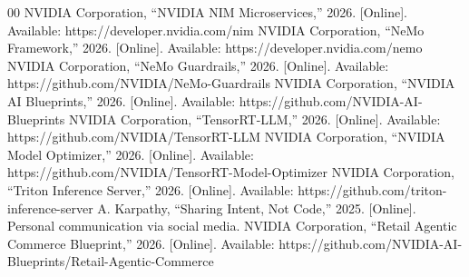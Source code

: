 \documentclass[conference]{IEEEtran}
\begin{document}
\begin{thebibliography}{00}
 NVIDIA Corporation, ``NVIDIA NIM Microservices,'' 2026. [Online]. Available: https://developer.nvidia.com/nim
 NVIDIA Corporation, ``NeMo Framework,'' 2026. [Online]. Available: https://developer.nvidia.com/nemo
 NVIDIA Corporation, ``NeMo Guardrails,'' 2026. [Online]. Available: https://github.com/NVIDIA/NeMo-Guardrails
 NVIDIA Corporation, ``NVIDIA AI Blueprints,'' 2026. [Online]. Available: https://github.com/NVIDIA-AI-Blueprints
 NVIDIA Corporation, ``TensorRT-LLM,'' 2026. [Online]. Available: https://github.com/NVIDIA/TensorRT-LLM
 NVIDIA Corporation, ``NVIDIA Model Optimizer,'' 2026. [Online]. Available: https://github.com/NVIDIA/TensorRT-Model-Optimizer
 NVIDIA Corporation, ``Triton Inference Server,'' 2026. [Online]. Available: https://github.com/triton-inference-server
 A. Karpathy, ``Sharing Intent, Not Code,'' 2025. [Online]. Personal communication via social media.
 NVIDIA Corporation, ``Retail Agentic Commerce Blueprint,'' 2026. [Online]. Available: https://github.com/NVIDIA-AI-Blueprints/Retail-Agentic-Commerce
\end{thebibliography}
\end{document}
